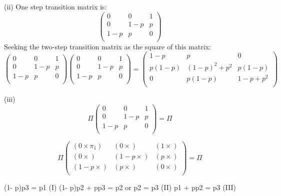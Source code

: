 \documentclass[a4paper,12pt]{article}
\begin{document}
\begin{enumerate}[(i)]
(ii) One step transition matrix is:
\[
\begin{pmatrix}
0 & 0 & 1\\
0 & 1-p & p \\
1-p & p & 0 \\
\end{pmatrix}
\]
Seeking the two-step transition matrix as the square of this matrix:
\[
\begin{pmatrix}
0 & 0 & 1\\
0 & 1-p & p \\
1-p & p & 0 \\
\end{pmatrix}\begin{pmatrix}
0 & 0 & 1\\
0 & 1-p & p \\
1-p & p & 0 \\
\end{pmatrix} = \begin{pmatrix}
1-p & p & 0\\
p(1-p) & (1-p)^2 + p^2 & p(1-p) \\
0 & p(1-p) & 1-p+p^2 \\
\end{pmatrix} 
\]

(iii)
\[ \Pi 
\begin{pmatrix}
0 & 0 & 1\\
0 & 1-p & p \\
1-p & p & 0 \\
\end{pmatrix}  = \Pi\]

\[ \Pi 
\begin{pmatrix}
(0 \times \pi_1) & (0 \times ) & (1 \times )\\
(0 \times ) & (1-p \times ) & (p \times ) \\
(1-p \times ) & (p \times ) & (0 \times ) \\
\end{pmatrix}  = \Pi\]


(1- p)p3 = p1 (I)
(1- p)p2 + pp3 = p2 or p2 = p3 (II)
p1 + pp2 = p3 (III)


\end{enumerate}
\end{document}
